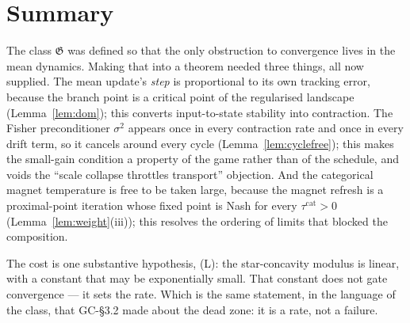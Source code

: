 \documentclass[11pt]{article}
\theoremstyle{definition}
\newcommand{\GC}[1]{\textsf{GC-#1}}
\begin{document}
\section{Summary}

The class $\mathfrak{G}$ was defined so that the only obstruction to convergence
lives in the mean dynamics. Making that into a theorem needed three things, all
now supplied. The mean update's \emph{step} is proportional to its own tracking
error, because the branch point is a critical point of the regularised landscape
(Lemma~\ref{lem:dom}); this converts input-to-state stability into contraction.
The Fisher preconditioner $\sigma^2$ appears once in every contraction rate and
once in every drift term, so it cancels around every cycle
(Lemma~\ref{lem:cyclefree}); this makes the small-gain condition a property of the
game rather than of the schedule, and voids the ``scale collapse throttles
transport'' objection. And the categorical magnet temperature is free to be taken
large, because the magnet refresh is a proximal-point iteration whose fixed point
is Nash for every $\tau^{\mathrm{cat}} > 0$ (Lemma~\ref{lem:weight}(iii)); this
resolves the ordering of limits that blocked the composition.

The cost is one substantive hypothesis, (L): the star-concavity modulus is linear,
with a constant that may be exponentially small. That constant does not gate
convergence --- it sets the rate. Which is the same statement, in the language of
the class, that \GC{\S3.2} made about the dead zone: it is a rate, not a failure.
\end{document}
